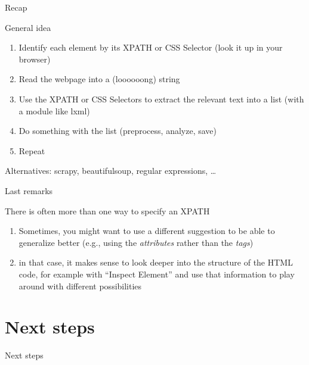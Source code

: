 \documentclass{beamer}
\begin{document}
\begin{frame}{Recap}
\begin{block}{General idea}
\begin{enumerate}
\item Identify each element by its XPATH or CSS Selector (look it up in your browser) 
\item Read the webpage into a (loooooong) string
\item Use the XPATH  or CSS Selectors to extract the relevant text into a list (with a module like lxml)
\item Do something with the list (preprocess, analyze, save)
\item Repeat
\end{enumerate}
\footnotesize{Alternatives: scrapy, beautifulsoup, regular expressions, \ldots}
\end{block}
\end{frame}




\begin{frame}{Last remarks}
	\begin{block}{There is often more than one way to specify an XPATH}
		\begin{enumerate}
			\item Sometimes, you might want to use a different suggestion to be able to generalize better (e.g., using the \emph{attributes} rather than the \emph{tags})
			\item in that case, it makes sense to look deeper into the structure of the HTML code, for example with ``Inspect Element'' and use that information to play around with different possibilities
		\end{enumerate}
	\end{block}
\end{frame}


{
	\begin{frame}[plain]
	\end{frame}
}

\section{Next steps}
\begin{frame}
Next steps
\end{frame}
\end{document}
